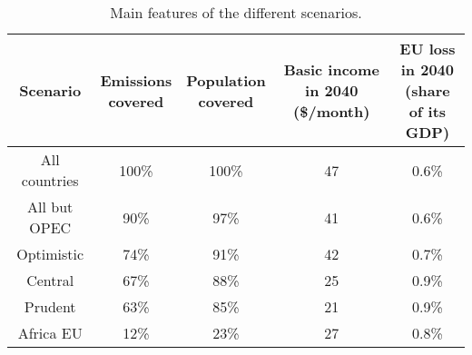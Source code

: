 \begin{table}[h]

\caption{\label{tab:scenarios_table.tex}Main features of the different scenarios.}
\centering
\begin{tabular}[t]{ccccc}
\toprule
Scenario & \makecell{Emissions\\covered} & \makecell{Population\\covered} & \makecell{Basic income\\in 2040 (\$/month)} & \makecell{EU loss in 2040\\(share of its GDP)}\\
\midrule
All countries & 100\% & 100\% & 47 & 0.6\%\\
All but OPEC & 90\% & 97\% & 41 & 0.6\%\\
Optimistic & 74\% & 91\% & 42 & 0.7\%\\
Central & 67\% & 88\% & 25 & 0.9\%\\
Prudent & 63\% & 85\% & 21 & 0.9\%\\
Africa EU & 12\% & 23\% & 27 & 0.8\%\\
\bottomrule
\end{tabular}
\end{table}